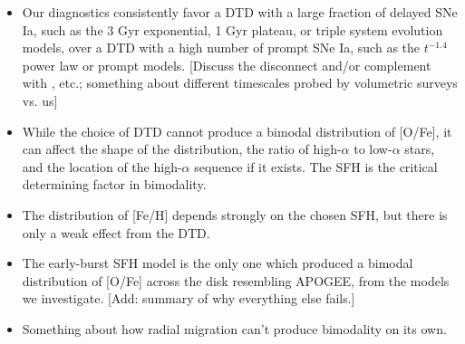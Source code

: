 \documentclass[twocolumn,linenumbers,twocolappendix]{aastex631}
\begin{document}
\begin{itemize}

    \item Our diagnostics consistently favor a DTD with a large fraction of delayed SNe Ia, such as the 3 Gyr exponential, 1 Gyr plateau, or triple system evolution models, over a DTD with a high number of prompt SNe Ia, such as the $t^{-1.4}$ power law or prompt models. [Discuss the disconnect and/or complement with \citet{Maoz2017-CosmicDTD}, etc.; something about different timescales probed by volumetric surveys vs. us]
    
    \item While the choice of DTD cannot produce a bimodal distribution of [O/Fe], it can affect the shape of the distribution, the ratio of high-$\alpha$ to low-$\alpha$ stars, and the location of the high-$\alpha$ sequence if it exists. The SFH is the critical determining factor in bimodality.

    \item The distribution of [Fe/H] depends strongly on the chosen SFH, but there is only a weak effect from the DTD.

    \item The early-burst SFH model is the only one which produced a bimodal distribution of [O/Fe] across the disk resembling APOGEE, from the models we investigate. [Add: summary of why everything else fails.]

    \item Something about how radial migration can't produce bimodality on its own.
    
\end{itemize}
\end{document}
